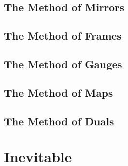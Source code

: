 \documentclass{antiquebook}
\begin{document}
    \section{The Method of Mirrors}
    
    \section{The Method of Frames}
    
    \section{The Method of Gauges}
    
    \section{The Method of Maps}
    
    \section{The Method of Duals}


\chapter{Inevitable}
\end{document}
